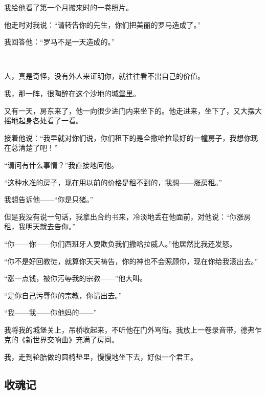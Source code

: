 \par 我给他看了第一个月搬来时的一卷照片。
\par 他走时对我说：“请转告你的先生，你们把美丽的罗马造成了。”
\par 我回答他：“罗马不是一天造成的。”
\par  
\par 人，真是奇怪，没有外人来证明你，就往往看不出自己的价值。
\par 我，那一阵，很陶醉在这个沙地的城堡里。
\par 又有一天，房东来了，他一向很少进门内来坐下的。他走进来，坐下了，又大摆大摇地起身各处看了一看。
\par 接着他说：“我早就对你们说，你们租下的是全撒哈拉最好的一幢房子，我想你现在总清楚了吧！”
\par “请问有什么事情？”我直接地问他。
\par “这种水准的房子，现在用以前的价格是租不到的，我想——涨房租。”
\par 我想告诉他——“你是只猪。”
\par 但是我没有说一句话，我拿出合约书来，冷淡地丢在他面前，对他说：“你涨房租，我明天就去告你。”
\par “你——你——你们西班牙人要欺负我们撒哈拉威人。”他居然比我还发怒。
\par “你不是好回教徒，就算你天天祷告，你的神也不会照顾你，现在你给我滚出去。”
\par “涨一点钱，被你污辱我的宗教——”他大叫。
\par “是你自己污辱你的宗教，你请出去。”
\par “我——我——你他妈的——”
\par 我将我的城堡关上，吊桥收起来，不听他在门外骂街。我放上一卷录音带，德弗乍克的《新世界交响曲》充满了房间。
\par 我，走到轮胎做的圆椅垫里，慢慢地坐下去，好似一个君王。


\subsection{收魂记}

